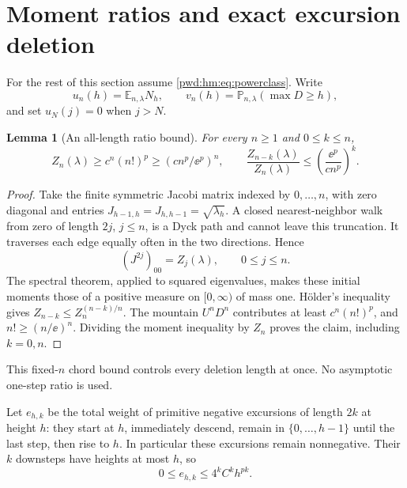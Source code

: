 \documentclass[11pt,letterpaper]{article}
\numberwithin{equation}{section}
\newtheorem{lemma}[theorem]{Lemma}
\theoremstyle{remark}\newtheorem{remark}[theorem]{Remark}
\newcommand{\E}{\mathbb E}\newcommand{\Prob}{\mathbb P}
\begin{document}
\section{Moment ratios and exact excursion deletion}\label{pwd:hm:sec:ratios}
For the rest of this section assume \eqref{pwd:hm:eq:powerclass}. Write
\[
 u_n(h)=\E_{n,\lambda}N_h,\qquad
 v_n(h)=\Prob_{n,\lambda}(\max D\ge h),
\]
and set $u_N(j)=0$ when $j>N$.

\begin{lemma}[An all-length ratio bound]\label{pwd:hm:lem:allk}
For every $n\ge1$ and $0\le k\le n$,
\begin{equation}\label{pwd:hm:eq:allk}
 Z_n(\lambda)\ge c^n(n!)^p\ge(cn^p/\ee^p)^n,
 \qquad
 \frac{Z_{n-k}(\lambda)}{Z_n(\lambda)}
 \le\left(\frac{\ee^p}{cn^p}\right)^k.
\end{equation}
\end{lemma}
\begin{proof}
Take the finite symmetric Jacobi matrix indexed by $0,\ldots,n$, with zero diagonal and entries $J_{h-1,h}=J_{h,h-1}=\sqrt{\lambda_h}$. A closed nearest-neighbor walk from zero of length $2j$, $j\le n$, is a Dyck path and cannot leave this truncation. It traverses each edge equally often in the two directions. Hence
\[
 (J^{2j})_{00}=Z_j(\lambda),\qquad 0\le j\le n.
\]
The spectral theorem, applied to squared eigenvalues, makes these initial moments those of a positive measure on $[0,\infty)$ of mass one. H\"older's inequality gives $Z_{n-k}\le Z_n^{(n-k)/n}$. The mountain $U^nD^n$ contributes at least $c^n(n!)^p$, and $n!\ge(n/\ee)^n$. Dividing the moment inequality by $Z_n$ proves the claim, including $k=0,n$.
\end{proof}
This fixed-$n$ chord bound controls every deletion length at once. No asymptotic one-step ratio is used.

Let $e_{h,k}$ be the total weight of primitive negative excursions of length $2k$ at height $h$: they start at $h$, immediately descend, remain in $\{0,\ldots,h-1\}$ until the last step, then rise to $h$. In particular these excursions remain nonnegative. Their $k$ downsteps have heights at most $h$, so
\begin{equation}\label{pwd:hm:eq:excursion-bound}
 0\le e_{h,k}\le4^kC^kh^{pk}.
\end{equation}
\end{document}
